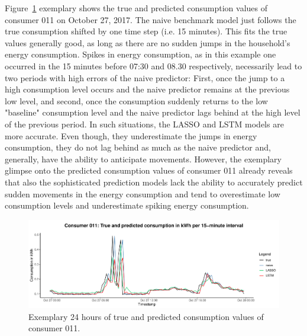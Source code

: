 Figure~\ref{Fig:glimpse_predcons} exemplary shows the true and predicted consumption values of consumer 011 on October 27, 2017. The naive benchmark model just follows the true consumption shifted by one time step (i.e. 15 minutes). This fits the true values generally good, as long as there are no sudden jumps in the household's energy consumption. Spikes in energy consumption, as in this example one occurred in the 15 minutes before 07:30 and 08.30 respectively, necessarily lead to two periods with high errors of the naive predictor: First, once the jump to a high consumption level occurs and the naive predictor remains at the previous low level, and second, once the consumption suddenly returns to the low "baseline" consumption level and the naive predictor lags behind at the high level of the previous period. In such situations, the LASSO and LSTM models are more accurate. Even though, they underestimate the jumps in energy consumption, they do not lag behind as much as the naive predictor and, generally, have the ability to anticipate movements. However, the exemplary glimpse onto the predicted consumption values of consumer 011 already reveals that also the sophisticated prediction models lack the ability to accurately predict sudden movements in the energy consumption and tend to overestimate low consumption levels and underestimate spiking energy consumption.
%
\begin{figure}[htbp]
    \centering
    \includegraphics[width=\textwidth]{thesis/graphs/evaluation/c011_pred_cons.pdf}
    \caption[Exemplary 24 hours of true and predicted consumption values]{Exemplary 24 hours of true and predicted consumption values of consumer 011. \quantnet\href{}{}}
    \label{Fig:glimpse_predcons}
\end{figure}
%

